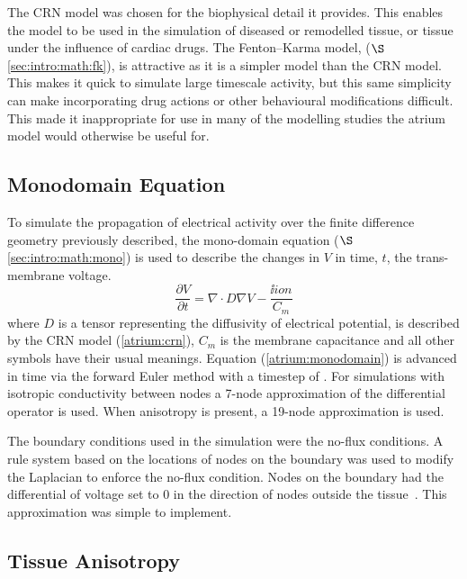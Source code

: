 The CRN model was chosen for the biophysical detail it provides.
This enables the model to be used in the simulation of diseased or remodelled tissue, or
tissue under the influence of cardiac drugs.
The Fenton--Karma model, ($\S$\ref{sec:intro:math:fk}), is attractive as it is a
simpler model than the CRN model.
This makes it quick to simulate large timescale activity, but this same
simplicity can make incorporating drug actions or other behavioural
modifications difficult.
This made it inappropriate for use in many of the modelling studies the atrium
model would otherwise be useful for.


\subsection{Monodomain Equation}

To simulate the propagation of electrical activity over the finite difference
geometry previously described, the mono-domain equation
($\S$\ref{sec:intro:math:mono}) is used to describe the
changes in $V$ in time, $t$, the trans-membrane voltage.
\begin{equation}
\label{atrium:monodomain}
\frac{\partial V}{\partial t} = \nabla\cdot D \nabla V - \frac{\ii{ion}}{C_{m}}
\end{equation}
where $D$ is a tensor representing the diffusivity of electrical potential,  is described by the
CRN model (\ref{atrium:crn}), $C_{m}$ is the membrane capacitance and all other
symbols have their usual meanings.  Equation (\ref{atrium:monodomain}) is
advanced in time via the forward Euler method with a timestep of .  For
simulations with isotropic conductivity between nodes a 7-node approximation of
the differential operator is used.  When anisotropy is present, a 19-node
approximation is used.

The boundary conditions used in the simulation were the no-flux conditions.
A rule system based on the locations of nodes on the boundary was used to modify
the Laplacian to enforce the no-flux condition.
Nodes on the boundary had the differential of voltage set to 0 in the direction
of nodes outside the tissue~\cite{Aslanidi2009}.
This approximation was simple to implement.

\subsection{Tissue Anisotropy}

